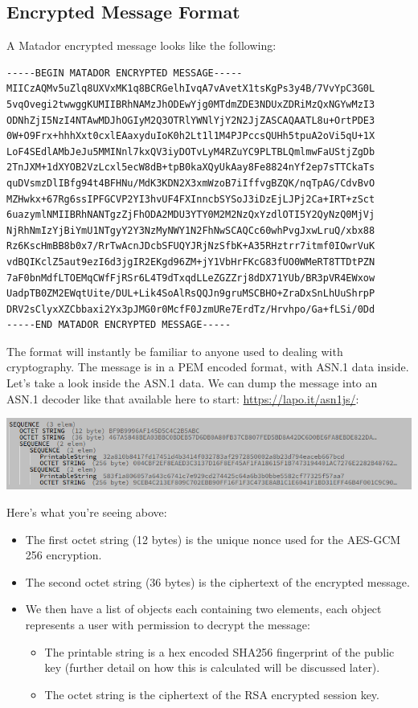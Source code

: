 \documentclass{article}[12pt]
\begin{document}
	\subsection{Encrypted Message Format}
		A Matador encrypted message looks like the following:
		
		\begin{lstlisting}[language={}]
-----BEGIN MATADOR ENCRYPTED MESSAGE-----
MIICzAQMv5uZlq8UXVxMK1q8BCRGelhIvqA7vAvetX1tsKgPs3y4B/7VvYpC3G0L
5vqOvegi2twwggKUMIIBRhNAMzJhODEwYjg0MTdmZDE3NDUxZDRiMzQxNGYwMzI3
ODNhZjI5NzI4NTAwMDJhOGIyM2Q3OTRlYWNlYjY2N2JjZASCAQAATL8u+OrtPDE3
0W+O9Frx+hhhXxt0cxlEAaxyduIoK0h2Lt1l1M4PJPccsQUHh5tpuA2oVi5qU+1X
LoF4SEdlAMbJeJu5MMINnl7kxQV3iyDOTvLyM4RZuYC9PLTBLQmlmwFaUStjZgDb
2TnJXM+1dXYOB2VzLcxl5ecW8dB+tpB0kaXQyUkAay8Fe8824nYf2ep7sTTCkaTs
quDVsmzDlIBfg94t4BFHNu/MdK3KDN2X3xmWzoB7iIffvgBZQK/nqTpAG/CdvBvO
MZHwkx+67Rg6ssIPFGCVP2YI3hvUF4FXInncbSYSoJ3iDzEjLJPj2Ca+IRT+zSct
6uazymlNMIIBRhNANTgzZjFhODA2MDU3YTY0M2M2NzQxYzdlOTI5Y2QyNzQ0MjVj
NjRhNmIzYjBiYmU1NTgyY2Y3NzMyNWY1N2FhNwSCAQCc60whPvgJxwLruQ/xbx88
Rz6KscHmBB8b0x7/RrTwAcnJDcbSFUQYJRjNzSfbK+A35RHztrr7itmf0IOwrVuK
vdBQIKclZ5aut9ezI6d3jgIR2EKgd96ZM+jY1VbHrFKcG83fUO0WMeRT8TTDtPZN
7aF0bnMdfLTOEMqCWfFjRSr6L4T9dTxqdLLeZGZZrj8dDX71YUb/BR3pVR4EWxow
UadpTB0ZM2EWqtUite/DUL+Lik4SoAlRsQQJn9gruMSCBHO+ZraDxSnLhUuShrpP
DRV2sClyxXZCbbaxi2Yx3pJMG0r0McfF0JzmURe7ErdTz/Hrvhpo/Ga+fLSi/0Dd
-----END MATADOR ENCRYPTED MESSAGE-----
		\end{lstlisting}
		
		The format will instantly be familiar to anyone used to dealing with cryptography. The message is in a PEM encoded format, with ASN.1 data inside. Let's take a look inside the ASN.1 data. We can dump the message into an ASN.1 decoder like that available here to start: \url{https://lapo.it/asn1js/}:
		
		\includegraphics[width=15cm]{encryptedmessageasn1.png}
		
		Here's what you're seeing above:
		
		\begin{itemize}
			\item The first octet string (12 bytes) is the unique nonce used for the AES-GCM 256 encryption.
			\item The second octet string (36 bytes) is the ciphertext of the encrypted message.
			\item We then have a list of objects each containing two elements, each object represents a user with permission to decrypt the message:
			\begin{itemize}
				\item The printable string is a hex encoded SHA256 fingerprint of the public key (further detail on how this is calculated will be discussed later).
				\item The octet string is the ciphertext of the RSA encrypted session key.
			\end{itemize}
		\end{itemize}
	
\end{document}
